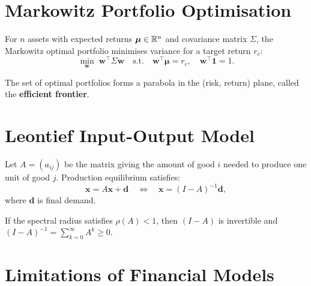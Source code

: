 \section{Markowitz Portfolio Optimisation}
\label{sec:markowitz}

\begin{definition}
For $n$ assets with expected returns $\boldsymbol{\mu}\in\mathbb{R}^n$ and
covariance matrix $\Sigma$, the Markowitz optimal portfolio minimises
variance for a target return $r_c$:
\[
  \min_{\mathbf{w}} \;\mathbf{w}^\top\Sigma\mathbf{w}
  \quad\text{s.t.}\quad
  \mathbf{w}^\top\boldsymbol{\mu}=r_c,\quad
  \mathbf{w}^\top\mathbf{1}=1.
\]
\end{definition}

\begin{proposition}
The set of optimal portfolios forms a parabola in the (risk, return)
plane, called the \textbf{efficient frontier}.
\end{proposition}

\section{Leontief Input-Output Model}

\begin{definition}
Let $A=(a_{ij})$ be the matrix giving the amount of good $i$ needed
to produce one unit of good $j$.  Production equilibrium satisfies:
\[
  \mathbf{x} = A\mathbf{x} + \mathbf{d}
  \quad\Leftrightarrow\quad
  \mathbf{x} = (I-A)^{-1}\mathbf{d},
\]
where $\mathbf{d}$ is final demand.
\end{definition}

\begin{proposition}
If the spectral radius satisfies $\rho(A)<1$, then $(I-A)$ is
invertible and $(I-A)^{-1}=\sum_{k=0}^\infty A^k\geq 0$.
\end{proposition}

\section{Limitations of Financial Models}


